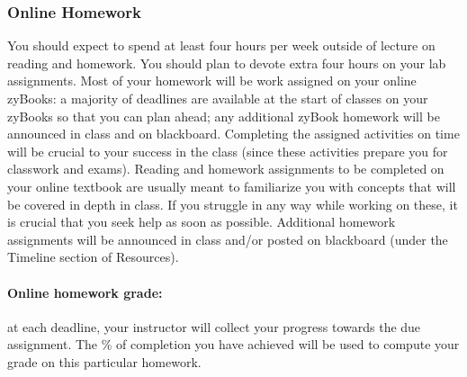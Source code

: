 \documentclass[12pt]{scrartcl}
\begin{document}
\subsubsection{Online Homework} 
You should expect to spend at least four hours per week outside of lecture on reading and homework. You should plan to devote extra four hours on your lab assignments. 
Most of your homework will be work assigned on your online zyBooks: 
a majority of deadlines are available at the start of classes on your zyBooks so that you can plan ahead;
any additional zyBook homework will be announced in class and on blackboard. 
Completing the assigned activities on time will be crucial to your success in the class (since these activities prepare you for classwork and exams). 
Reading and homework assignments to be completed on your online textbook are usually meant to familiarize you with concepts that will be covered in depth in class. 
If you struggle in any way while working on these, it is crucial that you seek help as soon as possible.
Additional homework assignments will be announced in class and/or posted on blackboard (under the Timeline section of Resources).


\paragraph{Online homework grade:} at each deadline, your instructor will collect your progress towards the due assignment. 
The \% of completion you have achieved will be used to compute your grade on this particular homework. 
\end{document}

